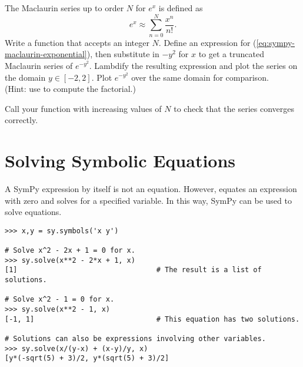 \begin{problem}
The Maclaurin series up to order $N$ for $e^x$ is defined as
\begin{equation}
e^x \approx \sum_{n=0}^N \frac{x^n}{n!}.
\label{eq:sympy-maclaurin-exponential}
\end{equation}
Write a function that accepts an integer $N$.
Define an expression for (\ref{eq:sympy-maclaurin-exponential}), then substitute in $-y^2$ for $x$ to get a truncated Maclaurin series of $e^{-y^2}$.
Lambdify the resulting expression and plot the series on the domain $y\in[-2,2]$.
Plot $e^{-y^2}$ over the same domain for comparison.
\\(Hint: use  to compute the factorial.)

Call your function with increasing values of $N$ to check that the series converges correctly.
\end{problem}

\section*{Solving Symbolic Equations} %

A SymPy expression by itself is not an equation.
However,  equates an expression with zero and solves for a specified variable.
In this way, SymPy can be used to solve equations.

\begin{lstlisting}
>>> x,y = sy.symbols('x y')

# Solve x^2 - 2x + 1 = 0 for x.
>>> sy.solve(x**2 - 2*x + 1, x)
[1]                                 # The result is a list of solutions.

# Solve x^2 - 1 = 0 for x.
>>> sy.solve(x**2 - 1, x)
[-1, 1]                             # This equation has two solutions.

# Solutions can also be expressions involving other variables.
>>> sy.solve(x/(y-x) + (x-y)/y, x)
[y*(-sqrt(5) + 3)/2, y*(sqrt(5) + 3)/2]
\end{lstlisting}

